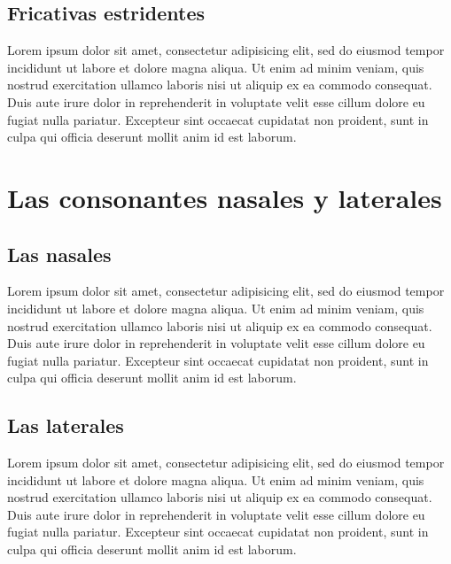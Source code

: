\documentclass[
]{book}
\begin{document}
\hypertarget{fricativas-estridentes}{%
\section{Fricativas estridentes}\label{fricativas-estridentes}}

Lorem ipsum dolor sit amet, consectetur adipisicing elit, sed do eiusmod
tempor incididunt ut labore et dolore magna aliqua. Ut enim ad minim veniam,
quis nostrud exercitation ullamco laboris nisi ut aliquip ex ea commodo
consequat. Duis aute irure dolor in reprehenderit in voluptate velit esse
cillum dolore eu fugiat nulla pariatur. Excepteur sint occaecat cupidatat non
proident, sunt in culpa qui officia deserunt mollit anim id est laborum.

\hypertarget{nasales-laterales}{%
\chapter{Las consonantes nasales y laterales}\label{nasales-laterales}}

\hypertarget{las-nasales}{%
\section{Las nasales}\label{las-nasales}}

Lorem ipsum dolor sit amet, consectetur adipisicing elit, sed do eiusmod
tempor incididunt ut labore et dolore magna aliqua. Ut enim ad minim veniam,
quis nostrud exercitation ullamco laboris nisi ut aliquip ex ea commodo
consequat. Duis aute irure dolor in reprehenderit in voluptate velit esse
cillum dolore eu fugiat nulla pariatur. Excepteur sint occaecat cupidatat non
proident, sunt in culpa qui officia deserunt mollit anim id est laborum.

\hypertarget{las-laterales}{%
\section{Las laterales}\label{las-laterales}}

Lorem ipsum dolor sit amet, consectetur adipisicing elit, sed do eiusmod
tempor incididunt ut labore et dolore magna aliqua. Ut enim ad minim veniam,
quis nostrud exercitation ullamco laboris nisi ut aliquip ex ea commodo
consequat. Duis aute irure dolor in reprehenderit in voluptate velit esse
cillum dolore eu fugiat nulla pariatur. Excepteur sint occaecat cupidatat non
proident, sunt in culpa qui officia deserunt mollit anim id est laborum.
\end{document}
